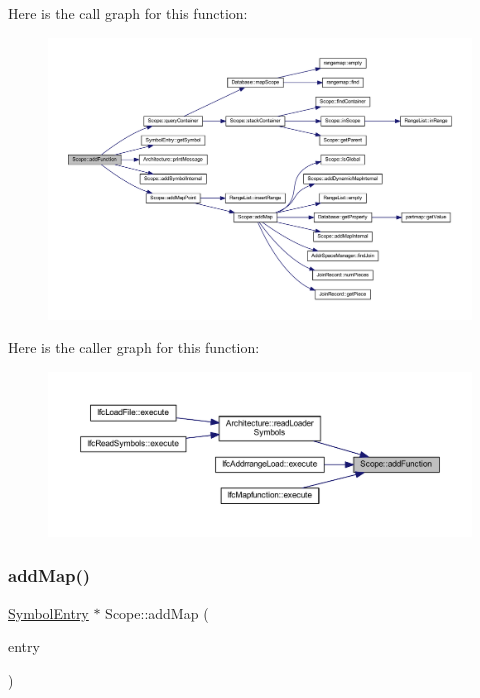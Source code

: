 Here is the call graph for this function\+:
\nopagebreak
\begin{figure}[H]
\begin{center}
\leavevmode
\includegraphics[width=350pt]{class_scope_a8f7f8bc9f073a957d43298394cac0678_cgraph}
\end{center}
\end{figure}
Here is the caller graph for this function\+:
\nopagebreak
\begin{figure}[H]
\begin{center}
\leavevmode
\includegraphics[width=350pt]{class_scope_a8f7f8bc9f073a957d43298394cac0678_icgraph}
\end{center}
\end{figure}
\mbox{\label{class_scope_ab93f6dfecb978ac52b56f967896ca758}} 
\subsubsection{\texorpdfstring{addMap()}{addMap()}}
{\footnotesize\ttfamily \mbox{\hyperlink{class_symbol_entry}{Symbol\+Entry}} $\ast$ Scope\+::add\+Map (\begin{DoxyParamCaption}\item[{const \mbox{\hyperlink{class_symbol_entry}{Symbol\+Entry}} \&}]{entry }\end{DoxyParamCaption})\hspace{0.3cm}{\ttfamily [protected]}}



